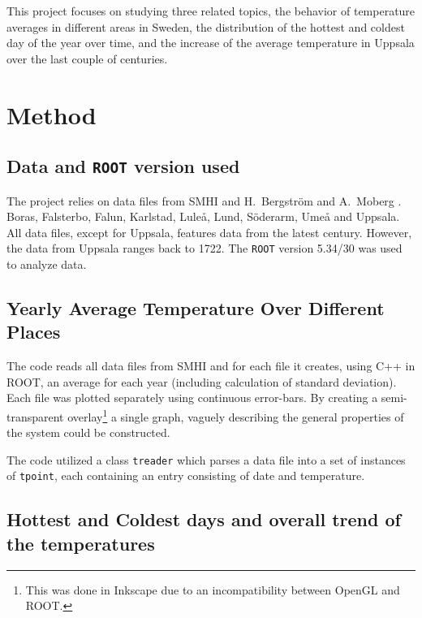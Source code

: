 \documentclass[a4paper]{article}
\begin{document}
\medskip
\medskip
This project focuses on studying three related topics, the behavior of temperature averages in different areas in Sweden, the distribution of the hottest and coldest day of the year over time, and the increase of the average temperature in Uppsala over the last couple of centuries.

\section{Method}\label{sec:Methods}

\subsection{Data and \texttt{ROOT} version used}
The project relies on data files from SMHI and H.~Bergström and A.~Moberg \cite{Uppsala}. Boras, Falsterbo, Falun, Karlstad, Luleå, Lund, Söderarm, Umeå and Uppsala. All data files, except for Uppsala, features data from the latest century. However, the data from Uppsala ranges back to 1722.
\linebreak
The \texttt{ROOT} version 5.34/30 was used to analyze data.

\subsection{Yearly Average Temperature Over Different Places}

The code reads all data files from SMHI and for each file it creates, using C++ in ROOT, an average for each year (including calculation of standard deviation). Each file was plotted separately using continuous error-bars. By creating a semi-transparent overlay\footnote{This was done in Inkscape due to an incompatibility between OpenGL and ROOT.} a single graph, vaguely describing the general properties of the system could be constructed.

\medskip
\medskip
The code utilized a class \texttt{treader} which parses a data file into a set of instances of \texttt{tpoint}, each containing an entry consisting of date and temperature.


\subsection{Hottest and Coldest days and overall trend of the temperatures}\label{sec:Saras method}
\end{document}
